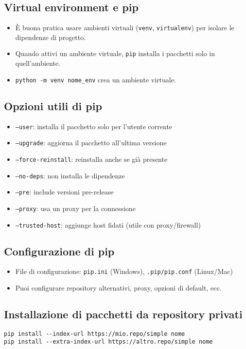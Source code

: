 \documentclass[a4paper,12pt]{article}
\begin{document}
\subsection*{Virtual environment e pip}
\begin{itemize}
    \item È buona pratica usare ambienti virtuali (\texttt{venv}, \texttt{virtualenv}) per isolare le dipendenze di progetto.
    \item Quando attivi un ambiente virtuale, \texttt{pip} installa i pacchetti solo in quell'ambiente.
    \item \texttt{python -m venv nome\_env} crea un ambiente virtuale.
\end{itemize}

\subsection*{Opzioni utili di pip}
\begin{itemize}
    \item \texttt{--user}: installa il pacchetto solo per l'utente corrente
    \item \texttt{--upgrade}: aggiorna il pacchetto all'ultima versione
    \item \texttt{--force-reinstall}: reinstalla anche se già presente
    \item \texttt{--no-deps}: non installa le dipendenze
    \item \texttt{--pre}: include versioni pre-release
    \item \texttt{--proxy}: usa un proxy per la connessione
    \item \texttt{--trusted-host}: aggiunge host fidati (utile con proxy/firewall)
\end{itemize}

\subsection*{Configurazione di pip}
\begin{itemize}
    \item File di configurazione: \texttt{pip.ini} (Windows), \texttt{.pip/pip.conf} (Linux/Mac)
    \item Puoi configurare repository alternativi, proxy, opzioni di default, ecc.
\end{itemize}

\subsection*{Installazione di pacchetti da repository privati}
\begin{lstlisting}
pip install --index-url https://mio.repo/simple nome
pip install --extra-index-url https://altro.repo/simple nome
\end{lstlisting}
\end{document}
